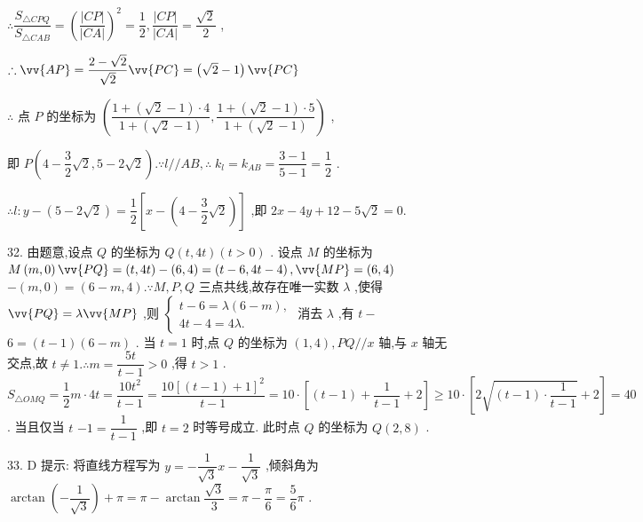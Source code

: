 $\therefore \dfrac{{S}_{\bigtriangleup {CPQ}}}{{S}_{\bigtriangleup {CAB}}} = {\left( \dfrac{\left| CP\right| }{\left| CA\right| }\right) }^{2} = \dfrac{1}{2},\dfrac{\left| CP\right| }{\left| CA\right| } = \dfrac{\sqrt{2}}{2}$ ,

$\therefore \vv{AP} = \dfrac{2 - \sqrt{2}}{\sqrt{2}}\vv{PC} = \left( {\sqrt{2} - 1}\right) \vv{PC}$

$\therefore$ 点 $P$ 的坐标为 $\left( {\dfrac{1 + \left( {\sqrt{2} - 1}\right)  \cdot  4}{1 + \left( {\sqrt{2} - 1}\right) },\dfrac{1 + \left( {\sqrt{2} - 1}\right)  \cdot  5}{1 + \left( {\sqrt{2} - 1}\right) }}\right)$ ,

即 $P\left( {4 - \dfrac{3}{2}\sqrt{2},5 - 2\sqrt{2}}\right) .\because l//{AB},\therefore \;{k}_{l} = {k}_{AB} = \dfrac{3 - 1}{5 - 1} = \dfrac{1}{2}$ .

$\therefore l : y - \left( {5 - 2\sqrt{2}}\right)  = \dfrac{1}{2}\left\lbrack  {x - \left( {4 - \dfrac{3}{2}\sqrt{2}}\right) }\right\rbrack$ ,即 ${2x} - {4y} + {12} - 5\sqrt{2} = 0.$

32. 由题意,设点 $Q$ 的坐标为 $Q\left( {t,{4t}}\right) \left( {t > 0}\right)$ . 设点 $M$ 的坐标为 $M\left( {m,0}\right) \vv{PQ} = \left( {t,{4t}}\right)  - \left( {6,4}\right)  = \left( {t - 6,{4t} - 4}\right) ,\vv{MP} = \left( {6,4}\right)$  $- \left( {m,0}\right)  = \left( {6 - m,4}\right) .\because M,P,Q$ 三点共线,故存在唯一实数 $\lambda$ ,使得 $\vv{PQ} = \lambda \vv{MP}$ ,则 $\left\{  \begin{array}{l} t - 6 = \lambda \left( {6 - m}\right) , \\  {4t} - 4 = {4\lambda }. \end{array}\right.$ 消去 $\lambda$ ,有 $t -$  $6 = \left( {t - 1}\right) \left( {6 - m}\right)$ . 当 $t = 1$ 时,点 $Q$ 的坐标为 $\left( {1,4}\right) ,{PQ}//x$ 轴,与 $x$ 轴无交点,故 $t \neq  1.\therefore m = \dfrac{5t}{t - 1} > 0$ ,得 $t > 1$ . ${S}_{\bigtriangleup {OMQ}} = \dfrac{1}{2}m \cdot  {4t} = \dfrac{{10}{t}^{2}}{t - 1} = \dfrac{{10}{\left\lbrack  \left( t - 1\right)  + 1\right\rbrack  }^{2}}{t - 1} = {10} \cdot  \left\lbrack  {\left( {t - 1}\right)  + \dfrac{1}{t - 1} + 2}\right\rbrack   \geq  {10} \cdot  \left\lbrack  {2\sqrt{\left( {t - 1}\right)  \cdot  \dfrac{1}{t - 1}} + 2}\right\rbrack   = {40}$ . 当且仅当 $t$  $- 1 = \dfrac{1}{t - 1}$ ,即 $t = 2$ 时等号成立. 此时点 $Q$ 的坐标为 $Q\left( {2,8}\right)$ .

33. D 提示: 将直线方程写为 $y =  - \dfrac{1}{\sqrt{3}}x - \dfrac{1}{\sqrt{3}}$ ,倾斜角为 $\arctan \left( {-\dfrac{1}{\sqrt{3}}}\right)  + \pi  = \pi  - \arctan \dfrac{\sqrt{3}}{3} = \pi  - \dfrac{\pi }{6} = \dfrac{5}{6}\pi$ .

